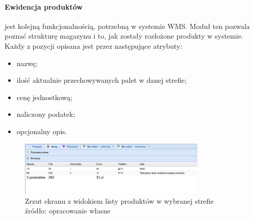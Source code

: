 		\paragraph{Ewidencja produktów} jest kolejną funkcjonalnością, potrzebną w systemie WMS.
		Moduł ten pozwala poznać strukturę magazynu i to, jak zostały rozłożone produkty w systemie.
		Każdy z pozycji opisana jest przez następujące atrybuty: 
		\begin{itemize}
			\item nazwę;
			\item ilość aktualnie przechowywanych palet w danej strefie;
			\item cenę jednostkową;
			\item naliczony podatek;
			\item opcjonalny opis.
		\end{itemize}
		\begin{figure}[H]
			\centering
			\includegraphics[width=0.8\textwidth]{images/app/unit_products_preview}
			\caption[Aplikacja - Ewidencja towarów w poszczególnych strefach]{
				Zrzut ekranu z widokiem listy produktów w wybranej strefie \\
				źródło: opracowanie własne
			}
			\label{c7:fig:app:unit_products_preview}
		\end{figure}
		
